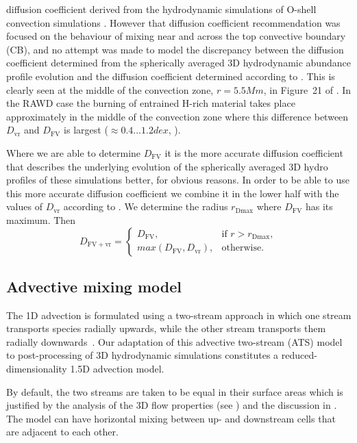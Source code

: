 \documentclass[fleqn,usenatbib]{mnras}
\begin{document}
diffusion coefficient derived from the hydrodynamic simulations of O-shell
convection simulations \citep[see Figure 21 in][]{Jones:2017kc}. However that
diffusion coefficient recommendation was focused on the behaviour of mixing near
and across the top convective boundary (CB), and no attempt was made to model
the discrepancy between the diffusion coefficient determined from the
spherically averaged 3D hydrodynamic abundance profile evolution and the
diffusion coefficient determined according to . This is clearly seen at
the middle of the convection zone, $r = \unit{5.5}{Mm}$, in Figure~21 of
\citet{Jones:2017kc}. In the RAWD case the burning of entrained H-rich material
takes place approximately in the middle of the convection zone where this
difference between $D_\mathrm{vr}$ and $D_\mathrm{FV}$ is largest ($\approx 0.4
\dots \unit{1.2}{dex}$, ).

Where we are able to determine $D_\mathrm{FV}$ it is the more accurate diffusion
coefficient that describes the underlying evolution of the spherically averaged
3D hydro profiles of these simulations better, for obvious reasons. In order to be able to use this
more accurate diffusion coefficient we combine it in the lower half with the
values of $D_\mathrm{vr}$ according to . We determine the radius
$r_\mathrm{Dmax}$ where $D_\mathrm{FV}$ has its maximum. Then
\begin{equation*}
  D_\mathrm{FV+vr}= \begin{cases}
  D_\mathrm{FV}, & \text{if } r > r_\mathrm{Dmax} , \\
  max(D_\mathrm{FV},D_\mathrm{vr}), & \text{otherwise}.
\end{cases}
\end{equation*}

\subsection{Advective mixing model}
\label{sec:advectmodel}

The 1D advection is formulated using a two-stream approach in which
one stream transports species radially upwards, while the other stream
transports them radially
downwards~\citep[][]{cannon1993, Henkel2017}. Our
adaptation of this advective two-stream (ATS) model to post-processing
of 3D hydrodynamic simulations constitutes a reduced-dimensionality
1.5D advection model.

By default, the two streams are taken to be equal in their surface
areas which is justified by the analysis of the 3D flow properties
(see ) and the discussion in
. The model can have horizontal mixing between up- and
downstream cells that are adjacent to each other.
\end{document}
